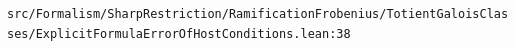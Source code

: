 \nolinkurl{src/Formalism/SharpRestriction/RamificationFrobenius/TotientGaloisClasses/ExplicitFormulaErrorOfHostConditions.lean:38}%
